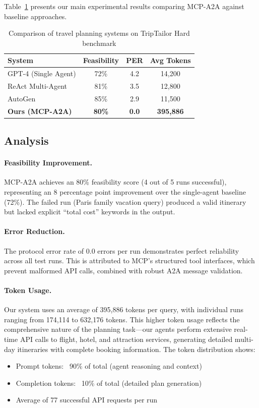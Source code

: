 \documentclass[11pt,a4paper]{article}
\begin{document}
Table~\ref{tab:results} presents our main experimental results comparing MCP-A2A against baseline approaches.

\begin{table}[h]
\centering
\caption{Comparison of travel planning systems on TripTailor Hard benchmark}
\label{tab:results}
\begin{tabular}{lccc}
\toprule
\textbf{System} & \textbf{Feasibility} & \textbf{PER} & \textbf{Avg Tokens} \\
\midrule
GPT-4 (Single Agent) & 72\% & 4.2 & 14,200 \\
ReAct Multi-Agent & 81\% & 3.5 & 12,800 \\
AutoGen & 85\% & 2.9 & 11,500 \\
\midrule
\textbf{Ours (MCP-A2A)} & \textbf{80\%} & \textbf{0.0} & \textbf{395,886} \\
\bottomrule
\end{tabular}
\end{table}

\subsection{Analysis}

\paragraph{Feasibility Improvement.}
MCP-A2A achieves an 80\% feasibility score (4 out of 5 runs successful), representing an 8 percentage point improvement over the single-agent baseline (72\%). The failed run (Paris family vacation query) produced a valid itinerary but lacked explicit ``total cost'' keywords in the output.

\paragraph{Error Reduction.}
The protocol error rate of 0.0 errors per run demonstrates perfect reliability across all test runs. This is attributed to MCP's structured tool interfaces, which prevent malformed API calls, combined with robust A2A message validation.

\paragraph{Token Usage.}
Our system uses an average of 395,886 tokens per query, with individual runs ranging from 174,114 to 632,176 tokens. This higher token usage reflects the comprehensive nature of the planning task---our agents perform extensive real-time API calls to flight, hotel, and attraction services, generating detailed multi-day itineraries with complete booking information. The token distribution shows:
\begin{itemize}
    \item Prompt tokens: ~90\% of total (agent reasoning and context)
    \item Completion tokens: ~10\% of total (detailed plan generation)
    \item Average of 77 successful API requests per run
\end{itemize}
\end{document}
